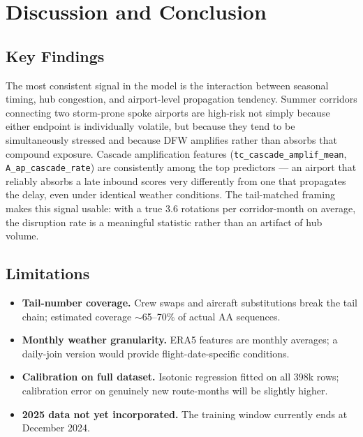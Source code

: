 \documentclass[11pt, twoside]{article}
\begin{document}
\clearpage
\section{Discussion and Conclusion}
\label{sec:discussion}

\subsection{Key Findings}

The most consistent signal in the model is the interaction between seasonal
timing, hub congestion, and airport-level propagation tendency.  Summer
corridors connecting two storm-prone spoke airports are high-risk not simply
because either endpoint is individually volatile, but because they tend to be
simultaneously stressed and because DFW amplifies rather than absorbs that
compound exposure.  Cascade amplification features
(\texttt{tc\_cascade\_amplif\_mean}, \texttt{A\_ap\_cascade\_rate}) are
consistently among the top predictors --- an airport that reliably absorbs a
late inbound scores very differently from one that propagates the delay,
even under identical weather conditions.  The tail-matched framing makes this
signal usable: with a true 3.6 rotations per corridor-month on average, the
disruption rate is a meaningful statistic rather than an artifact of hub volume.

\subsection{Limitations}

\begin{itemize}
  \item \textbf{Tail-number coverage.}  Crew swaps and aircraft substitutions
        break the tail chain; estimated coverage $\sim$65--70\% of actual AA sequences.
  \item \textbf{Monthly weather granularity.}  ERA5 features are monthly averages;
        a daily-join version would provide flight-date-specific conditions.
  \item \textbf{Calibration on full dataset.}  Isotonic regression fitted on all
        398k rows; calibration error on genuinely new route-months will be slightly higher.
  \item \textbf{2025 data not yet incorporated.}  The training window currently
        ends at December 2024.
\end{itemize}
\end{document}
